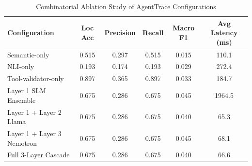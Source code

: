 \begin{table}[h]
\centering
\caption{Combinatorial Ablation Study of AgentTrace Configurations}
\begin{tabular}{lccccc}
\toprule
Configuration & Loc Acc & Precision & Recall & Macro F1 & Avg Latency (ms) \\
\midrule
Semantic-only & 0.515 & 0.297 & 0.515 & 0.015 & 110.1 \\
NLI-only & 0.193 & 0.174 & 0.193 & 0.029 & 272.4 \\
Tool-validator-only & 0.897 & 0.365 & 0.897 & 0.033 & 184.7 \\
Layer 1 SLM Ensemble & 0.675 & 0.286 & 0.675 & 0.045 & 1964.5 \\
Layer 1 + Layer 2 Llama & 0.675 & 0.286 & 0.675 & 0.040 & 65.3 \\
Layer 1 + Layer 3 Nemotron & 0.675 & 0.286 & 0.675 & 0.045 & 68.1 \\
Full 3-Layer Cascade & 0.675 & 0.286 & 0.675 & 0.040 & 66.6 \\
\bottomrule
\end{tabular}
\end{table}